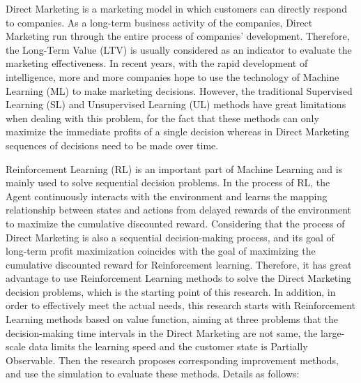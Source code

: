 \begin{enabstract}

Direct Marketing is a marketing model in which customers can directly respond to companies. As a long-term business activity of the companies, Direct Marketing run through the entire process of companies' development. Therefore, the Long-Term Value (LTV) is usually considered as an indicator to evaluate the marketing effectiveness. In recent years, with the rapid development of intelligence, more and more companies hope to use the technology of Machine Learning (ML) to make marketing decisions. However, the traditional Supervised Learning (SL) and Unsupervised Learning (UL) methods have great limitations when dealing with this problem, for the fact that these methods can only maximize the immediate profits of a single decision whereas in Direct Marketing sequences of decisions need to be made over time.

Reinforcement Learning (RL) is an important part of Machine Learning and is mainly used to solve sequential decision problems. In the process of RL, the Agent continuously interacts with the environment and learns the mapping relationship between states and actions from delayed rewards of the environment to maximize the cumulative discounted reward. Considering that the process of Direct Marketing is also a sequential decision-making process, and its goal of long-term profit maximization coincides with the goal of maximizing the cumulative discounted reward for Reinforcement learning. Therefore, it has great advantage to use Reinforcement Learning methods to solve the Direct Marketing decision problems, which is the starting point of this research. In addition, in order to effectively meet the actual needs, this research starts with Reinforcement Learning methods based on value function, aiming at three problems that the decision-making time intervals in the Direct Marketing are not same, the large-scale data limits the learning speed and the customer state is Partially Observable. Then the research proposes corresponding improvement methods, and use the simulation to evaluate these methods. Details as follows:


\end{enabstract}
